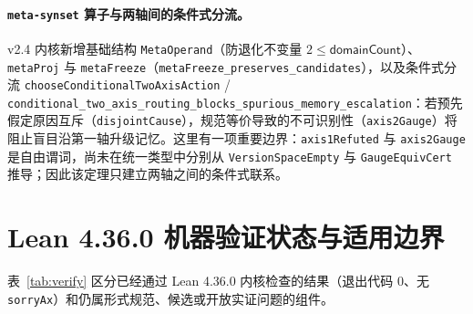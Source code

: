 \documentclass[11pt,a4paper,UTF8,fontset=fandol]{ctexart}
\DeclareRobustCommand{\id}[1]{\nolinkurl{#1}}
\begin{document}
\paragraph{\id{meta-synset} 算子与两轴间的条件式分流。}
v2.4 内核新增基础结构 \id{MetaOperand}（防退化不变量 $2\le\mathsf{domainCount}$）、\id{metaProj} 与 \id{metaFreeze}（\id{metaFreeze_preserves_candidates}），以及条件式分流 \id{chooseConditionalTwoAxisAction} / \id{conditional_two_axis_routing_blocks_spurious_memory_escalation}：若预先假定原因互斥（\id{disjointCause}），规范等价导致的不可识别性（\id{axis2Gauge}）将阻止盲目沿第一轴升级记忆。这里有一项重要边界：\id{axis1Refuted} 与 \id{axis2Gauge} 是自由谓词，尚未在统一类型中分别从 \id{VersionSpaceEmpty} 与 \id{GaugeEquivCert} 推导；因此该定理只建立两轴之间的条件式联系。

\section{Lean 4.36.0 机器验证状态与适用边界}
表~\ref{tab:verify} 区分已经通过 Lean 4.36.0 内核检查的结果（退出代码 0、无 \id{sorryAx}）和仍属形式规范、候选或开放实证问题的组件。
\end{document}
